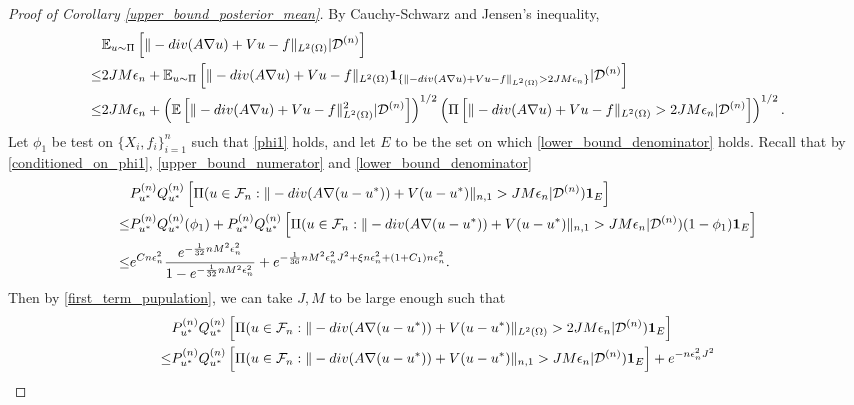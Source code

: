 \documentclass[10pt,a4paper]{amsart}
\newcommand{\D}{\mathcal{D}}
\newcommand{\E}{\mathbb{E}}
\newcommand{\F}{\mathcal{F}}
\renewcommand{\div}{\textnormal{div}}
\begin{document}
\begin{proof}[Proof of Corollary \ref{upper_bound_posterior_mean}]
    By Cauchy-Schwarz and Jensen's inequality, 
    \begin{equation} \label{posterior_mean_upper_bound}
        \begin{aligned}
            & \E_{u \sim \Pi} \left[  \|-\div(A \nabla u) + V u -f\|_{L^2(\Omega)} | \D^{(n)} \right] \\ \leq &  2J M \epsilon_n  + \E_{u \sim \Pi}\left[  \|-\div(A \nabla u) + V u -f\|_{L^2(\Omega)} \mathbf{1}_{\{  \|-\div(A \nabla u) + V u -f\|_{L^2(\Omega)} >2 J M \epsilon_n \}} | \D^{(n)}\right] \\
              \leq & 2J M \epsilon_n + \left(\E \left[ \|-\div(A \nabla u) + V u -f\|_{L^2(\Omega)}^2 | \D^{(n)}\right] \right)^{1/2} \left(\Pi \left[ \|-\div(A \nabla u) + V u -f\|_{L^2(\Omega)} >2 J M \epsilon_n | \D^{(n)} \right]\right)^{1/2}. 
        \end{aligned}
    \end{equation}
    Let $\phi_1$ be test on $\{X_i, f_i\}_{i=1}^n$ such that \eqref{phi1} holds, and let $E$ to be the set on which \eqref{lower_bound_denominator} holds. Recall that by \eqref{conditioned_on_phi1}, \eqref{upper_bound_numerator} and \eqref{lower_bound_denominator} 
    \begin{equation*}
        \begin{aligned}
            & P_{u^*}^{(n)} Q_{u^*}^{(n)} \left[\Pi(u \in \F_n: \|-\div(A \nabla (u-u^*)) + V (u-u^*) \|_{n, 1} >  J M \epsilon_n | \D^{(n)} ) \mathbf{1}_E \right] \\
            \leq &   P_{u^*}^{(n)} Q_{u^*}^{(n)} (\phi_1) + P_{u^*}^{(n)} Q_{u^*}^{(n)} \left[\Pi(u \in \F_n: \|-\div(A \nabla (u-u^*)) + V (u-u^*)\|_{n, 1} >  J M \epsilon_n | \D^{(n)} ) (1 - \phi_1)\mathbf{1}_E \right] \\
            \leq & e^{C n \epsilon_n^2} \frac{e^{-\frac{1}{32}n M^2 \epsilon_n^2}}{1 - e^{-\frac{1}{32}n M^2 \epsilon_n^2}} + e^{-\frac{1}{36} n M^2 \epsilon_{n}^2 J^2 + \xi n\epsilon_n^2 + (1+C_1) n \epsilon_n^2}. 
        \end{aligned}
    \end{equation*}
    Then by \eqref{first_term_pupulation}, we can take $J, M$ to be large enough such that 
    \begin{equation}
    \begin{aligned}
        & P_{u^*}^{(n)} Q_{u^*}^{(n)} \left[\Pi(u \in \F_n: \|-\div(A \nabla (u-u^*)) + V (u-u^*) \|_{L^2(\Omega)} > 2 J M \epsilon_n| \D^{(n)}) \mathbf{1}_E \right] \\
        \leq & P_{u^*}^{(n)} Q_{u^*}^{(n)} \left[\Pi(u \in \F_n: \|-\div(A \nabla (u-u^*)) + V (u-u^*) \|_{n, 1} >  J M \epsilon_n | \D^{(n)} ) \mathbf{1}_E \right] + e^{-  n\epsilon_n^2 J^2} \\

\end{aligned}
\end{equation}
\end{proof}
\end{document}
